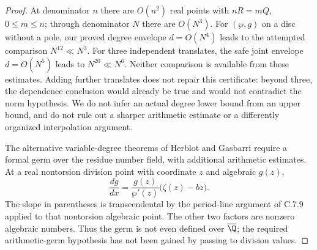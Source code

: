 \begin{proof}
At denominator $n$ there are $O(n^2)$ real points with
$nR=mQ$, $0\leq m\leq n$; through denominator $N$ there are
$O(N^3)$.  For $(\wp,g)$ on a disc without a pole, our proved
degree envelope $d=O(N^4)$ leads to the attempted comparison
$N^{12}\ll N^3$.  For three independent translates, the
safe joint envelope $d=O(N^5)$ leads to
$N^{20}\ll N^6$.  Neither comparison is available from
these estimates.  Adding further translates does not repair
this certificate: beyond three, the dependence conclusion
would already be true and would not contradict the norm
hypothesis.  We do not infer an actual degree lower bound
from an upper bound, and do not rule out a sharper arithmetic
estimate or a differently organized interpolation argument.

The alternative variable-degree theorems of Herblot and
Gasbarri require a formal germ over the residue number field,
with additional arithmetic estimates.  At a real nontorsion
division point with coordinate $z$ and algebraic $g(z)$,
\[
 \frac{dg}{dx}=\frac{g(z)}{\wp'(z)}
                         \bigl(\zeta(z)-bz\bigr).
\]
The slope in parentheses is transcendental by the period-line
argument of C.7.9 applied to that nontorsion algebraic point.
The other two factors are nonzero algebraic numbers.
Thus the germ is not even defined over $\overline\Q$;
the required arithmetic-germ hypothesis has not been gained
by passing to division values.
\end{proof}
